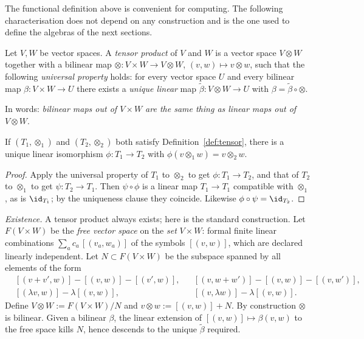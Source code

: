 The functional definition above is convenient for computing. The following characterisation does not depend on any
construction and is the one used to define the algebras of the next sections.

\begin{definition}\label{def:tensor}
Let $V,W$ be vector spaces. A \emph{tensor product} of $V$ and $W$ is a vector space
$V\otimes W$ together with a bilinear map $\otimes:V\times W\to V\otimes W$,
$(v,w)\mapsto v\otimes w$, such that the following \emph{universal property} holds:
for every vector space $U$ and every bilinear map $\beta:V\times W\to U$ there exists a
\emph{unique linear} map $\tilde\beta:V\otimes W\to U$ with $\beta=\tilde\beta\circ\otimes$.
\[

\]
\end{definition}

In words: \emph{bilinear maps out of $V\times W$ are the same thing as linear maps out of $V\otimes W$}.

\begin{proposition}[Uniqueness]
If $(T_1,\otimes_1)$ and $(T_2,\otimes_2)$ both satisfy Definition~\ref{def:tensor}, there is a unique
linear isomorphism $\phi:T_1\to T_2$ with $\phi(v\otimes_1w)=v\otimes_2w$.
\end{proposition}
\begin{proof}
Apply the universal property of $T_1$ to $\otimes_2$ to get $\phi:T_1\to T_2$, and that of $T_2$ to $\otimes_1$ to get
$\psi:T_2\to T_1$. Then $\psi\circ\phi$ is a linear map $T_1\to T_1$ compatible with $\otimes_1$, as is $\id_{T_1}$;
by the uniqueness clause they coincide. Likewise $\phi\circ\psi=\id_{T_2}$.
\end{proof}

\emph{Existence.} A tensor product always exists; here is the standard construction.
Let $F(V\times W)$ be the \emph{free vector space} on the \emph{set} $V\times W$: formal finite linear combinations
$\sum_a c_a\,[(v_a,w_a)]$ of the symbols $[(v,w)]$, which are declared linearly independent.
Let $N\subset F(V\times W)$ be the subspace spanned by all elements of the form
\begin{align*}
&[(v+v',w)]-[(v,w)]-[(v',w)], & &[(v,w+w')]-[(v,w)]-[(v,w')],\\
&[(\lambda v,w)]-\lambda[(v,w)], & &[(v,\lambda w)]-\lambda[(v,w)].
\end{align*}
Define $V\otimes W:=F(V\times W)/N$ and $v\otimes w:=[(v,w)]+N$. By construction $\otimes$ is bilinear.
Given a bilinear $\beta$, the linear extension of $[(v,w)]\mapsto\beta(v,w)$ to the free space kills $N$,
hence descends to the unique $\tilde\beta$ required. 

